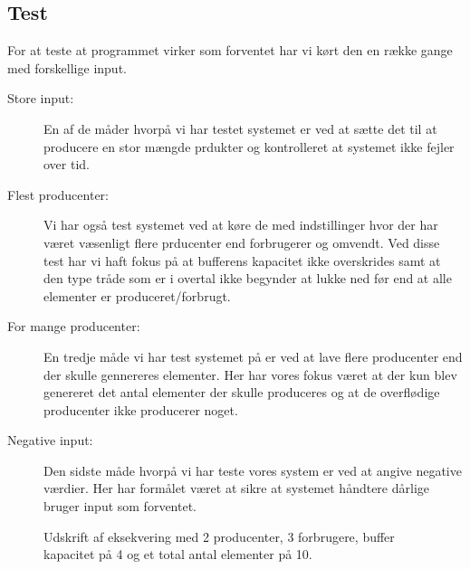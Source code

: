 \documentclass[main.tex]{subfile}
\begin{document}
\subsection{Test}
For at teste at programmet virker som forventet har vi kørt den en række gange med forskellige input.
\begin{description}
\item[Store input:] En af de måder hvorpå vi har testet systemet er ved at sætte det til at producere en stor mængde prdukter og kontrolleret at systemet ikke fejler over tid. 
\item[Flest producenter:] Vi har også test systemet ved at køre de med indstillinger hvor der har været væsenligt flere prducenter end forbrugerer og omvendt. Ved disse test har vi haft fokus på at bufferens kapacitet ikke overskrides samt at den type tråde som er i overtal ikke begynder at lukke ned før end at alle elementer er produceret/forbrugt.
\item[For mange producenter:] En tredje måde vi har test systemet på er ved at lave flere producenter end der skulle gennereres elementer. Her har vores fokus været at der kun blev genereret det antal elementer der skulle produceres og at de overflødige producenter ikke producerer noget.
\item[Negative input:] Den sidste måde hvorpå vi har teste vores system er ved at angive negative værdier. Her har formålet været at sikre at systemet håndtere dårlige bruger input som forventet.  
\end{description} 


\begin{figure}[H]
\centering
{}
\caption{Udskrift af eksekvering med 2 producenter, 3 forbrugere, buffer kapacitet på 4 og et total antal elementer på 10.}
\label{fig:opg2_2_test}
\end{figure}
\end{document}
